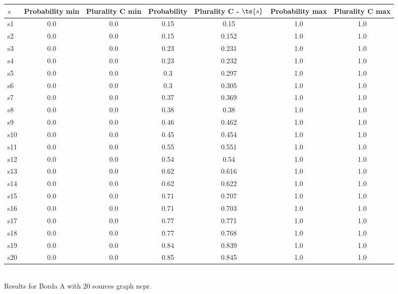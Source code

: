\documentclass{article}
\begin{document}
\noindent\begin{tabular}{|l|c|c|c|c|c|c|}
\hline
$s$& Probability min & Plurality C min & Probability & Plurality C - $\ts{s}$ & Probability max & Plurality C max\\
\hline
s1 &0.0 & 0.0 & 0.15 & 0.15 & 1.0 & 1.0\\
\hline
s2 &0.0 & 0.0 & 0.15 & 0.152 & 1.0 & 1.0\\
\hline
s3 &0.0 & 0.0 & 0.23 & 0.231 & 1.0 & 1.0\\
\hline
s4 &0.0 & 0.0 & 0.23 & 0.232 & 1.0 & 1.0\\
\hline
s5 &0.0 & 0.0 & 0.3 & 0.297 & 1.0 & 1.0\\
\hline
s6 &0.0 & 0.0 & 0.3 & 0.305 & 1.0 & 1.0\\
\hline
s7 &0.0 & 0.0 & 0.37 & 0.369 & 1.0 & 1.0\\
\hline
s8 &0.0 & 0.0 & 0.38 & 0.38 & 1.0 & 1.0\\
\hline
s9 &0.0 & 0.0 & 0.46 & 0.462 & 1.0 & 1.0\\
\hline
s10 &0.0 & 0.0 & 0.45 & 0.454 & 1.0 & 1.0\\
\hline
s11 &0.0 & 0.0 & 0.55 & 0.551 & 1.0 & 1.0\\
\hline
s12 &0.0 & 0.0 & 0.54 & 0.54 & 1.0 & 1.0\\
\hline
s13 &0.0 & 0.0 & 0.62 & 0.616 & 1.0 & 1.0\\
\hline
s14 &0.0 & 0.0 & 0.62 & 0.622 & 1.0 & 1.0\\
\hline
s15 &0.0 & 0.0 & 0.71 & 0.707 & 1.0 & 1.0\\
\hline
s16 &0.0 & 0.0 & 0.71 & 0.703 & 1.0 & 1.0\\
\hline
s17 &0.0 & 0.0 & 0.77 & 0.771 & 1.0 & 1.0\\
\hline
s18 &0.0 & 0.0 & 0.77 & 0.768 & 1.0 & 1.0\\
\hline
s19 &0.0 & 0.0 & 0.84 & 0.839 & 1.0 & 1.0\\
\hline
s20 &0.0 & 0.0 & 0.85 & 0.845 & 1.0 & 1.0\\
\hline
\end{tabular}\\

\noindent Results for Borda A with 20 sources graph ncpr.
\end{document}
